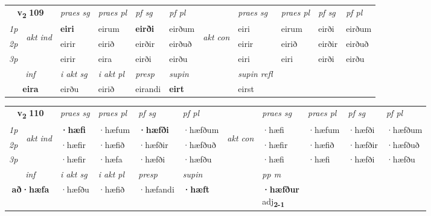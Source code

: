 \noindent
\begin{tabular}{lllllllllll} \toprule
\multicolumn{2}{c}{\textbf{v{\textsubscript{2}}} \Large{\textbf{109}}}  &  \textit{praes sg}  & \textit{praes pl}  &\textit{ pf sg} & \textit{pf pl} &  &  \textit{praes sg}  & \textit{praes pl}  & \textit{pf sg} & \textit{pf pl } \\*
	\cmidrule{3-6} \cmidrule{8-11}
 {\textit{1p}} & \multirow{3}{*}{\begin{turn}{90}\textit{akt ind}\end{turn}} & \textbf{eiri} & eirum & \textbf{eirði} & eirðum & \multirow{3}{*}{\begin{turn}{90}\textit{akt con}\end{turn}} &eiri & eirum & eirði & eirðum\\*
 {\textit{2p}} &  &  eirir  & eirið & eirðir & eirðuð & & eirir & eirið & eirðir & eirðuð \\*
{\textit{3p}} &  & eirir & eira & eirði & eirðu & & eiri & eiri& eirði & eirðu \\*
\cmidrule{3-6} \cmidrule{8-11}

   \multicolumn{2}{c}{\textit{inf}}  & \textit{i akt sg} & \textit{i akt pl}   & \textit{presp} & \textit{supin} && \textit{supin refl}  \\*
  \multicolumn{2}{c}{\textbf{eira}} & eirðu  & eirið   & eirandi &  \textbf{eirt} && eirst  \\*
\end{tabular}

\noindent
\begin{tabular}{lllllllllll} \toprule
\multicolumn{2}{c}{\textbf{v{\textsubscript{2}}} \Large{\textbf{110}}}  &  \textit{praes sg}  & \textit{praes pl}  &\textit{ pf sg} & \textit{pf pl} &  &  \textit{praes sg}  & \textit{praes pl}  & \textit{pf sg} & \textit{pf pl } \\*
	\cmidrule{3-6} \cmidrule{8-11}
 {\textit{1p}} & \multirow{3}{*}{\begin{turn}{90}\textit{akt ind}\end{turn}} & \textbf{·hæfi} & ·hæfum & \textbf{·hæfði} & ·hæfðum & \multirow{3}{*}{\begin{turn}{90}\textit{akt con}\end{turn}} &·hæfi & ·hæfum & ·hæfði & ·hæfðum\\*
 {\textit{2p}} &  &  ·hæfir  & ·hæfið & ·hæfðir & ·hæfðuð & & ·hæfir & ·hæfið & ·hæfðir & ·hæfðuð \\*
{\textit{3p}} &  & ·hæfir & ·hæfa & ·hæfði & ·hæfðu & & ·hæfi & ·hæfi& ·hæfði & ·hæfðu \\*
\cmidrule{3-6} \cmidrule{8-11}

   \multicolumn{2}{c}{\textit{inf}}  & \textit{i akt sg} & \textit{i akt pl}   & \textit{presp} & \textit{supin}  && \textit{pp m} \\*
  \multicolumn{2}{c}{\textbf{að\allowbreak ·hæfa}} & ·hæfðu  & ·hæfið   & ·hæfandi &  \textbf{·hæft}  && \specialcell{\textbf{·hæfður} \\ adj\textbf{\textsubscript{2-1}}} \\*
\end{tabular}

